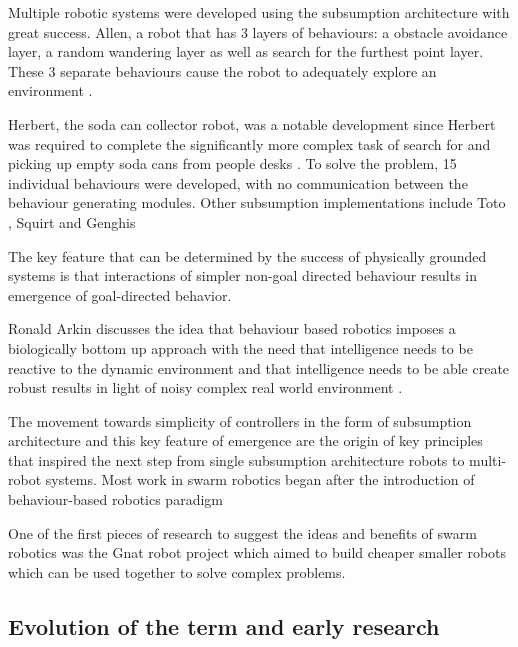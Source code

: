 Multiple robotic systems were developed using the subsumption architecture with great success. Allen, a robot that has 3 layers of behaviours: a obstacle avoidance layer, a random wandering layer as well as search for the furthest point layer. These 3 separate behaviours cause the robot to adequately explore an environment \cite{brooks1986robust}.

Herbert, the soda can collector robot, was a notable development since Herbert was required to complete the significantly more complex task of search for and picking up empty soda cans from people desks \cite{connell1989colony}. To solve the problem, 15 individual behaviours were developed, with no communication between the behaviour generating modules. Other subsumption implementations include Toto \cite{mataric1990distributed}, Squirt \cite{flynn1989world} and Genghis \cite{brooks1989robot}

The key feature that can be determined by the success of physically grounded systems is that interactions of simpler non-goal directed behaviour results in emergence of goal-directed behavior. 

Ronald Arkin discusses the idea that behaviour based robotics imposes a biologically bottom up approach with the need that intelligence needs to be reactive to the dynamic environment and that intelligence needs to be able create robust results in light of noisy complex real world environment \cite{arkin1990integrating}. %

The movement towards simplicity of controllers in the form of subsumption architecture and this key feature of emergence are the origin of key principles that inspired the next step from single subsumption architecture robots to multi-robot systems. Most work in swarm robotics began after the introduction of behaviour-based robotics paradigm \cite{arai2002editorial}

One of the first pieces of research to suggest the ideas and benefits of swarm robotics was the Gnat robot project \cite{flynn1987gnat} which aimed to build cheaper smaller robots which can be used together to solve complex problems.


\subsection{Evolution of the term and early research}
\label{early-research}

